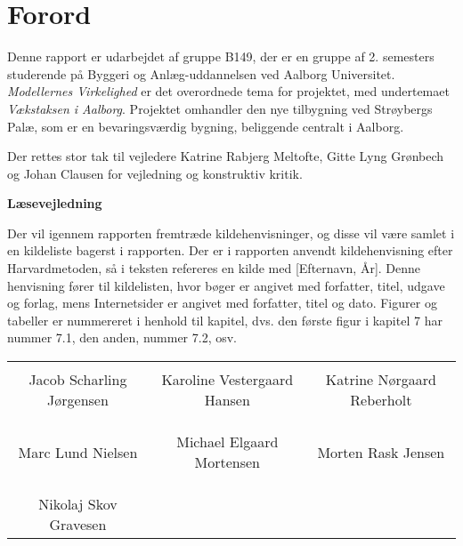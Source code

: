 \chapter*{Forord}
Denne rapport er udarbejdet af gruppe B149, der er en gruppe af 2. semesters studerende på Byggeri og Anlæg-uddannelsen ved Aalborg Universitet. \textit{Modellernes Virkelighed} er det overordnede tema for projektet, med undertemaet \textit{Vækstaksen i Aalborg}. Projektet omhandler den nye tilbygning ved Strøybergs Palæ, som er en bevaringsværdig bygning, beliggende centralt i Aalborg. 

Der rettes stor tak til vejledere Katrine Rabjerg Meltofte, Gitte Lyng Grønbech og Johan Clausen for vejledning og konstruktiv kritik. 

\textbf{Læsevejledning}

Der vil igennem rapporten fremtræde kildehenvisninger, og disse vil være samlet i en kildeliste bagerst i rapporten. Der er i rapporten anvendt kildehenvisning efter Harvardmetoden, så i teksten refereres en kilde med [Efternavn, År]. Denne henvisning fører til kildelisten, hvor bøger er angivet med forfatter, titel, udgave og forlag, mens Internetsider er angivet med forfatter, titel og dato. Figurer og tabeller er nummereret i henhold til kapitel, dvs. den første figur i kapitel 7 har nummer 7.1, den anden, nummer 7.2, osv. 

\phantom{Luft}

\phantom{Luft}

\begin{table}[H]
	\centering
		\begin{tabular}{c c c}
			\underline{\phantom{mmmmmmmmmmmmmm}} & \underline{\phantom{mmmmmmmmmmmmmm}} & \underline{\phantom{mmmmmmmmmmmmmm}} \\
			Jacob Scharling Jørgensen			& Karoline Vestergaard Hansen 		& Katrine Nørgaard Reberholt 			\\
			&&\\
			&&\\
			\underline{\phantom{mmmmmmmmmmmmmm}} & \underline{\phantom{mmmmmmmmmmmmmm}} & \underline{\phantom{mmmmmmmmmmmmmm}} \\
			Marc Lund Nielsen			& Michael Elgaard Mortensen 		& Morten Rask Jensen 				\\
			&&\\
			&&\\
			\underline{\phantom{mmmmmmmmmmmmmm}} \\
			Nikolaj Skov Gravesen						
		\end{tabular}
\end{table}